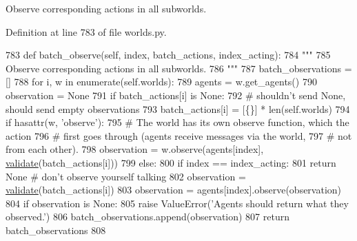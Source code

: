 \begin{DoxyVerb}Observe corresponding actions in all subworlds.
\end{DoxyVerb}
 

Definition at line 783 of file worlds.\+py.


\begin{DoxyCode}
783     \textcolor{keyword}{def }batch\_observe(self, index, batch\_actions, index\_acting):
784         \textcolor{stringliteral}{"""}
785 \textcolor{stringliteral}{        Observe corresponding actions in all subworlds.}
786 \textcolor{stringliteral}{        """}
787         batch\_observations = []
788         \textcolor{keywordflow}{for} i, w \textcolor{keywordflow}{in} enumerate(self.worlds):
789             agents = w.get\_agents()
790             observation = \textcolor{keywordtype}{None}
791             \textcolor{keywordflow}{if} batch\_actions[i] \textcolor{keywordflow}{is} \textcolor{keywordtype}{None}:
792                 \textcolor{comment}{# shouldn't send None, should send empty observations}
793                 batch\_actions[i] = [\{\}] * len(self.worlds)
794             \textcolor{keywordflow}{if} hasattr(w, \textcolor{stringliteral}{'observe'}):
795                 \textcolor{comment}{# The world has its own observe function, which the action}
796                 \textcolor{comment}{# first goes through (agents receive messages via the world,}
797                 \textcolor{comment}{# not from each other).}
798                 observation = w.observe(agents[index], \hyperlink{namespaceparlai_1_1core_1_1worlds_afc3fad603b7bce41dbdc9cdc04a9c794}{validate}(batch\_actions[i]))
799             \textcolor{keywordflow}{else}:
800                 \textcolor{keywordflow}{if} index == index\_acting:
801                     \textcolor{keywordflow}{return} \textcolor{keywordtype}{None}  \textcolor{comment}{# don't observe yourself talking}
802                 observation = \hyperlink{namespaceparlai_1_1core_1_1worlds_afc3fad603b7bce41dbdc9cdc04a9c794}{validate}(batch\_actions[i])
803             observation = agents[index].observe(observation)
804             \textcolor{keywordflow}{if} observation \textcolor{keywordflow}{is} \textcolor{keywordtype}{None}:
805                 \textcolor{keywordflow}{raise} ValueError(\textcolor{stringliteral}{'Agents should return what they observed.'})
806             batch\_observations.append(observation)
807         \textcolor{keywordflow}{return} batch\_observations
808 
\end{DoxyCode}
\mbox{\label{classparlai_1_1core_1_1worlds_1_1BatchWorld_a2b8dd323969084eedc03a7ab44647117}} 
